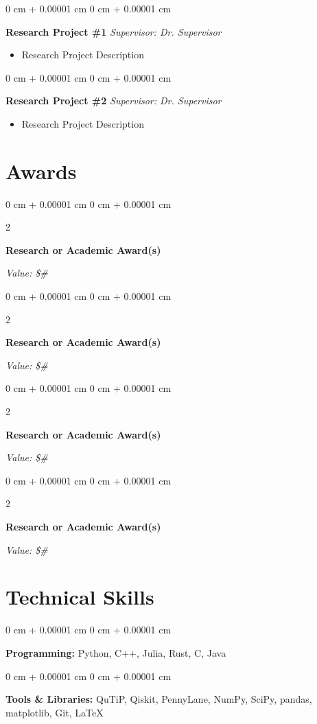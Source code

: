 \documentclass[10pt, letterpaper]{article}
\newenvironment{highlights}{
    \begin{itemize}[
        topsep=0.05 cm,
        parsep=0.10 cm,
        partopsep=0pt,
        itemsep=0pt,
        leftmargin=0 cm + 10pt
    ]
}{
    \end{itemize}
} %
\newenvironment{onecolentry}{
    \begin{adjustwidth}{
        0 cm + 0.00001 cm
    }{
        0 cm + 0.00001 cm
    }
}{
    \end{adjustwidth}
} %
\newenvironment{twocolentry}[2][]{
    \onecolentry
    \def\secondColumn{#2}
    \setcolumnwidth{\fill, 4.5 cm}
    \begin{paracol}{2}
}{
    \switchcolumn \raggedleft \secondColumn
    \end{paracol}
    \endonecolentry
} %
\begin{document}
        \begin{onecolentry}
        \textbf{Research Project \#1} \textit{Supervisor: Dr. Supervisor}
            \begin{highlights}
            \item Research Project Description 
            \end{highlights}
        \end{onecolentry}

        \vspace{0.10 cm}

        \begin{onecolentry}
        \textbf{Research Project \#2} \textit{Supervisor: Dr. Supervisor}
            \begin{highlights}
            \item Research Project Description 
            \end{highlights}
        \end{onecolentry}

    \section{Awards}
        \begin{twocolentry}{
            \textit{Value: \$\#}
        }
            \textbf{Research or Academic Award(s)}
        \end{twocolentry}
        \begin{twocolentry}{
            \textit{Value: \$\#}
        }
            \textbf{Research or Academic Award(s)}
        \end{twocolentry}
        \begin{twocolentry}{
            \textit{Value: \$\#}
        }
            \textbf{Research or Academic Award(s)}
        \end{twocolentry}
        \begin{twocolentry}{
            \textit{Value: \$\#}
        }
            \textbf{Research or Academic Award(s)}
        \end{twocolentry}

    \section{Technical Skills}
      \begin{onecolentry}
        \textbf{Programming:} Python, C++, Julia, Rust, C, Java
      \end{onecolentry}
      \begin{onecolentry}
        \textbf{Tools \& Libraries:} QuTiP, Qiskit, PennyLane, NumPy, SciPy, pandas, matplotlib, Git, LaTeX
      \end{onecolentry}
        
\end{document}
